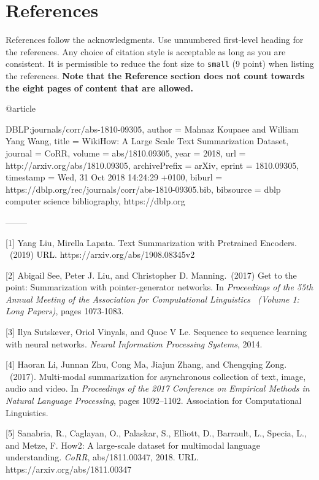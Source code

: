 \documentclass{article}
\begin{document}
\section*{References}

References follow the acknowledgments. Use unnumbered first-level heading for
the references. Any choice of citation style is acceptable as long as you are
consistent. It is permissible to reduce the font size to \verb+small+ (9 point)
when listing the references.
{\bf Note that the Reference section does not count towards the eight pages of content that are allowed.}
\medskip

\small


@article{DBLP:journals/corr/abs-1810-09305,
  author    = {Mahnaz Koupaee and
               William Yang Wang},
  title     = {WikiHow: {A} Large Scale Text Summarization Dataset},
  journal   = {CoRR},
  volume    = {abs/1810.09305},
  year      = {2018},
  url       = {http://arxiv.org/abs/1810.09305},
  archivePrefix = {arXiv},
  eprint    = {1810.09305},
  timestamp = {Wed, 31 Oct 2018 14:24:29 +0100},
  biburl    = {https://dblp.org/rec/journals/corr/abs-1810-09305.bib},
  bibsource = {dblp computer science bibliography, https://dblp.org}

--------

[1] Yang Liu, Mirella Lapata. Text Summarization with Pretrained Encoders.  \ (2019) URL. https://arxiv.org/abs/1908.08345v2

[2] Abigail See, Peter J. Liu, and Christopher D. Manning.\ (2017) Get to the point: Summarization with pointer-generator networks. In {\it Proceedings of the 55th Annual Meeting of the Association for Computational Linguistics \ (Volume 1: Long Papers)}, pages 1073-1083.

[3] Ilya Sutskever, Oriol Vinyals, and Quoc V Le. Sequence to sequence learning with neural networks.
 {\it Neural Information Processing Systems}, 2014. 

[4] Haoran Li, Junnan Zhu, Cong Ma, Jiajun Zhang, and Chengqing Zong. \ (2017). Multi-modal summarization for
asynchronous collection of text, image, audio and video. In {\it Proceedings of the 2017 Conference on Empirical
Methods in Natural Language Processing}, pages 1092–1102. Association for Computational Linguistics.

[5] Sanabria, R., Caglayan, O., Palaskar, S., Elliott, D., Barrault, L., Specia, L., and Metze, F. How2: A large-scale dataset for multimodal language understanding. {\it CoRR}, abs/1811.00347, 2018. URL. https://arxiv.org/abs/1811.00347

}
\end{document}

